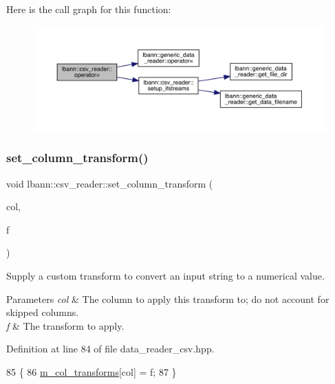 Here is the call graph for this function\+:\nopagebreak
\begin{figure}[H]
\begin{center}
\leavevmode
\includegraphics[width=350pt]{classlbann_1_1csv__reader_aaede525f7ac80484691822f27ef79cfc_cgraph}
\end{center}
\end{figure}
\mbox{\label{classlbann_1_1csv__reader_a919b0f22b1a78a08a686ac1178560f3d}} 
\subsubsection{\texorpdfstring{set\+\_\+column\+\_\+transform()}{set\_column\_transform()}}
{\footnotesize\ttfamily void lbann\+::csv\+\_\+reader\+::set\+\_\+column\+\_\+transform (\begin{DoxyParamCaption}\item[{int}]{col,  }\item[{std\+::function$<$ Data\+Type(const std\+::string \&)$>$}]{f }\end{DoxyParamCaption})\hspace{0.3cm}{\ttfamily [inline]}}

Supply a custom transform to convert an input string to a numerical value. 
\begin{DoxyParams}{Parameters}
{\em col} & The column to apply this transform to; do not account for skipped columns. \\
\hline
{\em f} & The transform to apply. \\
\hline
\end{DoxyParams}


Definition at line 84 of file data\+\_\+reader\+\_\+csv.\+hpp.


\begin{DoxyCode}
85                                                                        \{
86     \hyperlink{classlbann_1_1csv__reader_aad98a20225b1f2545de32b4c19c8285b}{m\_col\_transforms}[col] = f;
87   \}
\end{DoxyCode}
\mbox{\label{classlbann_1_1csv__reader_abc40f1b5848b1dcaf72cd1b84196c78e}} 

